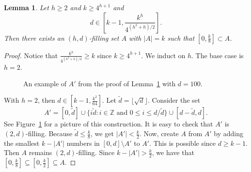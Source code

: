 \documentclass[10pt,a4paper]{article}
\newtheorem{lemma}[theorem]{Lemma}
\theoremstyle{definition}
\theoremstyle{remark}
\numberwithin{equation}{section}
\numberwithin{theorem}{section}
\newcommand{\Z}{\mathbb{Z}}
\begin{document}
\begin{lemma}\label{lemmaauxilliary}
    Let $h \geq 2$ and $k \geq 4^{h+1}$ and \[d \in \left[k-1,\frac{k^h}{4^{(h^2+h)/2}}\right].\] Then there exists an $(h,d)$-filling set $A$ with $|A| = k$ such that $[0,\frac{k}{8}] \subset A$.
\end{lemma}
\begin{proof}
    Notice that $\frac{k^h}{4^{(h^2+h)/2}} \geq k$ since $k \geq 4^{h+1}$. We induct on $h$. The base case is $h = 2$.

    \begin{figure}
            \centering
            \caption{An example of $A'$ from the proof of Lemma~\ref{lemmaauxilliary} with $d = 100$.}
            \label{figA'}
            
            \end{figure}

    With $h=2$, then $d \in [k-1,\frac{k^2}{64}]$. Let $\tilde{d} = \lfloor \sqrt{d}\rfloor$. Consider the set \[A' = [0, \tilde{d}] \cup \{i\tilde{d}: i \in \Z\text{ and } 0 \leq i \leq d/\tilde{d}\} \cup [d-\tilde{d},d].\] See Figure~\ref{figA'} for a picture of this construction. It is easy to check that $A'$ is $(2,d)$-filling. Because $\tilde{d} \leq \frac{k}8$, we get $|A'| < \frac{k}{2}$. Now, create $A$ from $A'$ by adding the smallest $k - |A'|$ numbers in $[0,d]\setminus A'$ to $A'$. This is possible since $d \geq k-1$. Then $A$ remains $(2,d)$-filling. Since $k - |A'|>\frac{k}{2}$, we have that $[0,\frac{k}{8}]\subseteq [0,\frac{k}{2}] \subseteq A$.
        

\end{proof}
\end{document}
